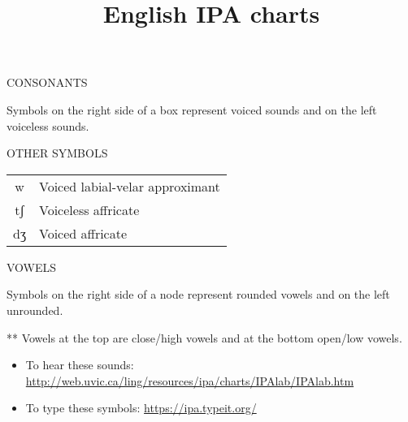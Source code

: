 \documentclass{article}
\title{English IPA charts}
\date{}
\newcommand{\headspace}{0.4cm}
\begin{document}
  \maketitle
  CONSONANTS

  \vspace{\headspace}

  \begin{adjustbox}{width=\textwidth}
    
  \end{adjustbox}

  {\tiny *Symbols on the right side of a box represent voiced sounds and on the left voiceless sounds.}

  \vspace{2cm}

  \parbox[l]{0.5\textwidth}{
    OTHER SYMBOLS

    \vspace{\headspace}

    \begin{adjustbox}{width=0.3\textwidth}
      \begin{tabular}{c l}
        w  & Voiced labial-velar approximant \\
        tʃ & Voiceless affricate \\
        dʒ & Voiced affricate
      \end{tabular}
    \end{adjustbox}
  }
  \parbox[r]{0.5\textwidth}{
    VOWELS

    \vspace{\headspace}

    \begin{adjustbox}{width=0.3\textwidth}
      
    \end{adjustbox}
  }

  \begin{flushright}
    {\tiny *Symbols on the right side of a node represent rounded vowels and on the left unrounded.

    ** Vowels at the top are close/high vowels and at the bottom open/low vowels.}
  \end{flushright}

  \begin{itemize}
    \item To hear these sounds: \url{http://web.uvic.ca/ling/resources/ipa/charts/IPAlab/IPAlab.htm}
    \item To type these symbols: \url{https://ipa.typeit.org/}
  \end{itemize}
\end{document}
